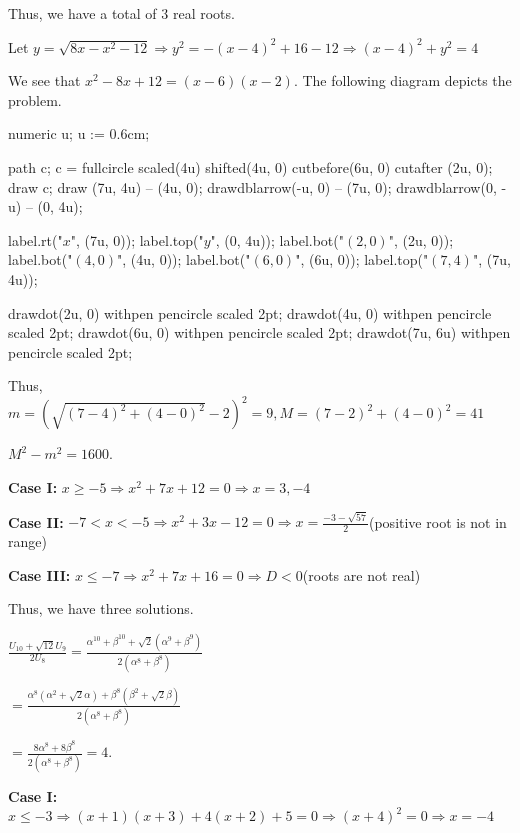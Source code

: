  Thus, we have a total of $3$ real roots.
\item Let $y = \sqrt{8x - x^2 - 12}\Rightarrow y^2 = -(x - 4)^2 + 16 - 12\Rightarrow (x - 4)^2 + y^2 = 4$

  We see that $x^2 - 8x + 12 = (x - 6)(x - 2)$. The following diagram depicts the problem.

  \startplacefigure[location=force]
    \startMPcode
      numeric u;
      u := 0.6cm;

      path c;
      c = fullcircle scaled(4u) shifted(4u, 0) cutbefore(6u, 0) cutafter (2u, 0);
      draw c;
      draw (7u, 4u) -- (4u, 0);
      drawdblarrow(-u, 0) -- (7u, 0);
      drawdblarrow(0, -u) -- (0, 4u);

      label.rt("$x$", (7u, 0));
      label.top("$y$", (0, 4u));
      label.bot("$(2, 0)$", (2u, 0));
      label.bot("$(4, 0)$", (4u, 0));
      label.bot("$(6, 0)$", (6u, 0));
      label.top("$(7, 4)$", (7u, 4u));

      drawdot(2u, 0) withpen pencircle scaled 2pt;
      drawdot(4u, 0) withpen pencircle scaled 2pt;
      drawdot(6u, 0) withpen pencircle scaled 2pt;
      drawdot(7u, 6u) withpen pencircle scaled 2pt;
    \stopMPcode
  \stopplacefigure

  Thus, $m = \left(\sqrt{(7 - 4)^2 + (4 - 0)^2} - 2\right)^2 = 9, M = (7 - 2)^2 + (4 - 0)^2 = 41$

  $M^2 - m^2 = 1600$.
\item {\bf Case I:} $x\geq -5\Rightarrow x^2 + 7x + 12 = 0\Rightarrow x = 3, -4$

  {\bf Case II:} $-7 < x < -5\Rightarrow x^2 + 3x - 12 = 0\Rightarrow x = \frac{-3 - \sqrt{57}}{2}$(positive
  root is not in range)

  {\bf Case III:} $x\leq -7\Rightarrow x^2 + 7x + 16 = 0 \Rightarrow D < 0$(roots are not real)

  Thus, we have three solutions.
\item $\frac{U_{10} + \sqrt{12}U_9}{2U_8} = \frac{\alpha^{10} + \beta^{10} + \sqrt{2}\left(\alpha^9
  + \beta^9\right)}{2\left(\alpha^8 + \beta^8\right)}$

  $= \frac{\alpha^8\left(\alpha^2 + \sqrt{2}\alpha\right) + \beta^8\left(\beta^2
  + \sqrt{2}\beta\right)}{2\left(\alpha^8 + \beta^8\right)}$

  $= \frac{8\alpha^8 + 8\beta^8}{2\left(\alpha^8 + \beta^8\right)} = 4$.
\item {\bf Case I:} $x\leq -3\Rightarrow (x + 1)(x + 3)  + 4(x + 2) + 5 = 0\Rightarrow (x + 4)^2 =
  0 \Rightarrow x = -4$

